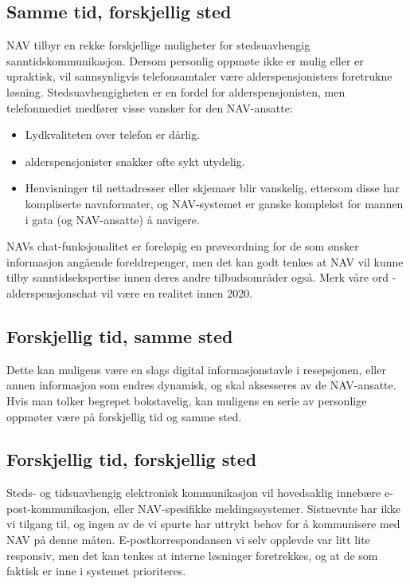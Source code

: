 \documentclass[informationsecurity]{gucmasterproject}
\begin{document}
\subsection{Samme tid, forskjellig sted}
NAV tilbyr en rekke forskjellige muligheter for stedsuavhengig sanntidskommunikasjon. Dersom personlig oppmøte ikke er mulig eller er upraktisk, vil sannsynligvis telefonsamtaler være alderspensjonisters foretrukne løsning. Stedsuavhengigheten er en fordel for alderspensjonisten, men telefonmediet medfører visse vansker for den NAV-ansatte:
\begin{itemize}
\item Lydkvaliteten over telefon er dårlig.
\item alderspensjonister snakker ofte sykt utydelig.
\item Henvisninger til nettadresser eller skjemaer blir vanskelig, ettersom disse har kompliserte navnformater, og NAV-systemet er ganske komplekst for mannen i gata (og NAV-ansatte) å navigere.
\end{itemize}

NAVs chat-funksjonalitet er foreløpig en prøveordning for de som ønsker informasjon angående foreldrepenger, men det kan godt tenkes at NAV vil kunne tilby sanntidsekspertise innen deres andre tilbudsområder også. Merk våre ord - alderspensjonschat vil være en realitet innen 2020.

\subsection{Forskjellig tid, samme sted}
Dette kan muligens være en slags digital informasjonstavle i resepsjonen, eller annen informasjon som endres dynamisk, og skal aksesseres av de NAV-ansatte. Hvis man tolker begrepet bokstavelig, kan muligens en serie av personlige oppmøter være på forskjellig tid og samme sted.

\subsection{Forskjellig tid, forskjellig sted}
Steds- og tidsuavhengig elektronisk kommunikasjon vil hovedsaklig innebære e-post-kommunikasjon, eller NAV-spesifikke meldingssystemer. Sistnevnte har ikke vi tilgang til, og ingen av de vi spurte har uttrykt behov for å kommunisere med NAV på denne måten. E-postkorrespondansen vi selv opplevde var litt lite responsiv, men det kan tenkes at interne løsninger foretrekkes, og at de som faktisk er inne i systemet prioriteres.
\end{document}
